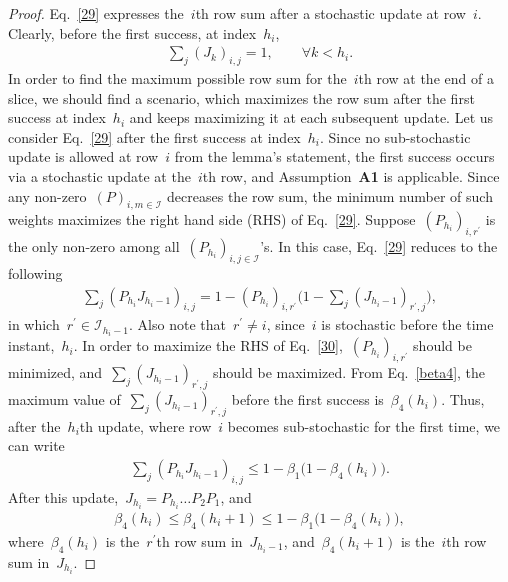 \documentclass[draftclsnofoot, onecolumn, 12pt]{IEEEtran}
\begin{document}
\begin{proof}
Eq.~\eqref{29} expresses the~$i$th row sum after a stochastic update at row~$i$. Clearly, before the first success, at index~$h_i$,
\begin{eqnarray*}
\sum_{j}(J_k)_{i,j}=1,\qquad \forall k < {h}_{i}.
\end{eqnarray*}
In order to find the maximum possible row sum for the~$i$th row at the end of a slice, we should find a scenario, which maximizes the row sum after the first success at index~$h_i$ and keeps maximizing it at each subsequent update. Let us consider Eq.~\eqref{29} after the first success at index~$h_i$. Since no sub-stochastic update is allowed at row~$i$ from the lemma's statement, the first success occurs via a stochastic update at the~$i$th row, and Assumption~{\bf A1} is applicable. Since any non-zero~$(P)_{i,m \in \mathcal{I}}$ decreases the row sum, the minimum number of such weights maximizes the right hand side (RHS) of Eq.~\eqref{29}. Suppose~$(P_{{h}_{i}})_{i,{r}^{\prime}}$ is the only non-zero among all~$(P_{{h}_{i}})_{i,j \in \mathcal{I}}$'s. In this case, Eq.~\eqref{29} reduces to the following
\begin{eqnarray}\label{30}
\sum_{j}(P_{{h}_{i}} J_{{{h}_{i}-1}})_{i,j}= 1 -  (P_{{h}_{i}})_{i,{r}^{\prime}}\Bigg(1-\sum_{j}(J_{{{h}_{i}-1}})_{{r}^{\prime},j}\Bigg),
\end{eqnarray}
in which~${r}^{\prime} \in \mathcal{I}_{{h}_{i}-1}$. Also note that~${r}^{\prime} \neq i$, since~$i$ is stochastic before the time instant,~$h_i$. In order to maximize the RHS of Eq.~\eqref{30},~$(P_{{h}_{i}})_{i,{r}^{\prime}}$ should be minimized, and~$\sum_{j}{(J_{{{h}_{i}-1}})}_{{r}^{\prime},j}$ should be maximized. From Eq.~\eqref{beta4}, the maximum value of~$\sum_{j}{(J_{{{h}_{i}-1}})}_{{r}^{\prime},j}$ before the first success is~${\beta}_4({h}_{i})$. Thus, after the~${h}_{i}$th update, where row~$i$ becomes sub-stochastic for the first time, we can write
\begin{eqnarray}\label{31}
\sum_{j}(P_{{h}_{i}} J_{{{h}_{i}-1}})_{i,j}\leq 1 - \beta_1 \Bigg(1-{\beta}_4({h}_{i})\Bigg).
\end{eqnarray}
After this update,~$J_{{h}_{i}}=P_{{h}_{i}}\ldots P_2 P_1$, and
\begin{eqnarray}
{\beta}_4({h}_{i}) \leq {\beta}_4({h}_{i}+1) \leq 1 - \beta_1 \Bigg(1-{\beta}_4({h}_{i})\Bigg),
\end{eqnarray}
where~${\beta}_4({h}_{i})$ is the~$r^{\prime}$th row sum in~$J_{{h_i}-1}$, and~${\beta}_4({h}_{i}+1)$ is the~$i$th row sum in~$J_{h_i}$.

\end{proof}
\end{document}
